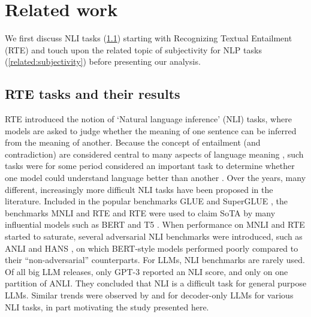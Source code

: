 \section{Related work}

We first discuss NLI tasks (\cref{related:nli}) starting with Recognizing Textual Entailment (RTE) \citep{dagan2005pascal} and touch upon the related topic of subjectivity for NLP tasks (\cref{related:subjectivity}) before presenting our analysis.

\subsection{RTE tasks and their results}
\label{related:nli}

RTE introduced the notion of `Natural language inference' (NLI) tasks, where models are asked to judge whether the meaning of one sentence can be inferred from the meaning of another.
Because the concept of entailment (and contradiction) are considered central to many aspects of language meaning \citep[e.g.][]{bowman-etal-2015-large}, such tasks were for some period considered an important task to determine whether one model could understand language better than another \citep{poliak-2020-survey}.
Over the years, many different, increasingly more difficult NLI tasks have been proposed in the literature.
Included in the popular benchmarks GLUE \citep{wang2019glue} and SuperGLUE \citep{wang2019superglue}, the benchmarks MNLI \citep{williams-etal-2018-broad} and RTE \citep{dagan2005pascal} and RTE were used to claim SoTA by many influential models such as BERT \citep{devlin2019bert} and T5 \citep{raffel2023t5}.
When performance on MNLI and RTE started to saturate, several adversarial NLI benchmarks were introduced, such as ANLI \citep{raffel2023t5} and HANS \citep{mccoy-etal-2019-right}, on which BERT-style models performed poorly compared to their ``non-adversarial'' counterparts.
For LLMs, NLI benchmarks are rarely used.
Of all big LLM releases, only GPT-3 \citep{brown2020language} reported an NLI score, and only on one partition of ANLI.
They concluded that NLI is a difficult task for general purpose LLMs.
Similar trends were observed by \citet{ohmer2024form} and \citet{weber-etal-2023-mind} for decoder-only LLMs for various NLI tasks, in part motivating the study presented here.

